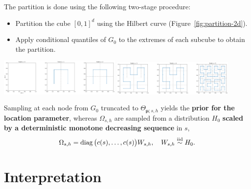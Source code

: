 \documentclass[a0,portrait]{a0poster}
\begin{document}
\begin{multicols}{2}
\begin{itemize}
        \vspace{.5cm}

        The partition is done using the following two-stage procedure:
        \begin{itemize}
            \item Partition the cube $ [0,1]^{d}$ using the Hilbert curve (Figure~\ref{fig:partition-2d}).

            \item Apply conditional quantiles of $ G_0$ to the extremes of each subcube to obtain the partition.
        \end{itemize}

        \begin{center}
            \includegraphics[trim={0 0 0 0}, clip, width=0.45\textwidth]{figures/partition_2d_top2.png}
            \includegraphics[trim={0 0 0 0}, clip, width=0.45\textwidth]{figures/partition_2d_bot2.png}
            \label{fig:partition-2d}
        \end{center}

        Sampling at each node from $ G_0$ truncated to $ \Theta_{\bm{\mu}; s,h}$ yields the \textbf{prior for the location parameter}, whereas $ \Omega_{s,h}$ are sampled from a distribution $ H_0$ \textbf{scaled by a deterministic monotone decreasing sequence} in $ s$,
        \[
                        \Omega_{s,h} = \operatorname{diag} \big( c(s), \ldots, c(s) \big) W_{s,h}, \quad W_{s,h} \overset{\text{iid}}{\sim} H_0.
        \]
        

\end{itemize}
\color{DarkRed}
\section*{Interpretation}
\label{prop}
\color{Black}


\end{multicols}
\end{document}
